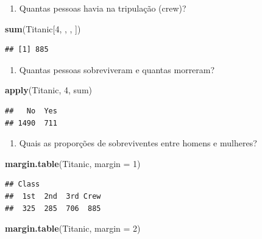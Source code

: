 \documentclass[]{book}
\newenvironment{Shaded}{\begin{snugshade}}{\end{snugshade}}
\newcommand{\DataTypeTok}[1]{\textcolor[rgb]{0.13,0.29,0.53}{#1}}
\newcommand{\DecValTok}[1]{\textcolor[rgb]{0.00,0.00,0.81}{#1}}
\newcommand{\KeywordTok}[1]{\textcolor[rgb]{0.13,0.29,0.53}{\textbf{#1}}}
\newcommand{\NormalTok}[1]{#1}
\providecommand{\tightlist}{%
  \setlength{\itemsep}{0pt}\setlength{\parskip}{0pt}}
\begin{document}
\begin{enumerate}
\def\labelenumi{\arabic{enumi}.}
\setcounter{enumi}{1}
\tightlist
\item
  Quantas pessoas havia na tripulação (crew)?
\end{enumerate}

\begin{Shaded}
\begin{Highlighting}[]
\KeywordTok{sum}\NormalTok{(Titanic[}\DecValTok{4}\NormalTok{, , , ])}
\end{Highlighting}
\end{Shaded}

\begin{verbatim}
## [1] 885
\end{verbatim}

\begin{enumerate}
\def\labelenumi{\arabic{enumi}.}
\setcounter{enumi}{2}
\tightlist
\item
  Quantas pessoas sobreviveram e quantas morreram?
\end{enumerate}

\begin{Shaded}
\begin{Highlighting}[]
\KeywordTok{apply}\NormalTok{(Titanic, }\DecValTok{4}\NormalTok{, sum)}
\end{Highlighting}
\end{Shaded}

\begin{verbatim}
##   No  Yes 
## 1490  711
\end{verbatim}

\begin{enumerate}
\def\labelenumi{\arabic{enumi}.}
\setcounter{enumi}{3}
\tightlist
\item
  Quais as proporções de sobreviventes entre homens e mulheres?
\end{enumerate}

\begin{Shaded}
\begin{Highlighting}[]
\KeywordTok{margin.table}\NormalTok{(Titanic, }\DataTypeTok{margin =} \DecValTok{1}\NormalTok{)}
\end{Highlighting}
\end{Shaded}

\begin{verbatim}
## Class
##  1st  2nd  3rd Crew 
##  325  285  706  885
\end{verbatim}

\begin{Shaded}
\begin{Highlighting}[]
\KeywordTok{margin.table}\NormalTok{(Titanic, }\DataTypeTok{margin =} \DecValTok{2}\NormalTok{)}
\end{Highlighting}
\end{Shaded}
\end{document}
